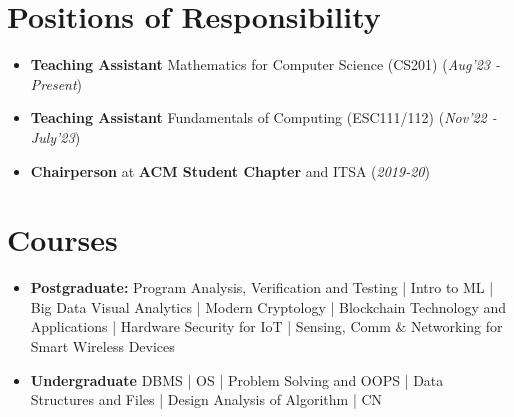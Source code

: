 \documentclass[10.8pt, a4paper]{extarticle}
\newcommand{\shorterSection}[1]{\vspace{-10pt}\section{#1}}
\begin{document}
\shorterSection{Positions of Responsibility}
\vspace{-2pt}
\begin{itemize}
    \item \textbf{Teaching Assistant} Mathematics for Computer Science (CS201) \hfill\hfill(\textit{Aug'23 - Present})
    \item \textbf{Teaching Assistant} Fundamentals of Computing (ESC111/112) \hfill\hfill(\textit{Nov'22 - July'23})
    \item \textbf{Chairperson} at \textbf{ACM Student Chapter} and ITSA \hfill\hfill(\textit{2019-20})
\end{itemize}

\shorterSection{Courses}
\vspace{-2pt}
\begin{itemize}
  \item \textbf{Postgraduate: }
    Program Analysis, Verification and Testing |
    Intro to ML |
    Big Data Visual Analytics |
    Modern Cryptology |
    Blockchain Technology and Applications |
    Hardware Security for IoT |
    Sensing, Comm $\&$ Networking for Smart Wireless Devices
  \item \textbf{Undergraduate}
      DBMS |
      OS |
      Problem Solving and OOPS |
      Data Structures and Files |
      Design Analysis of Algorithm |
      CN
\end{itemize}
\end{document}
